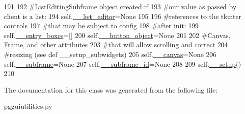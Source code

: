 \begin{DoxyCode}
191 
192         \textcolor{comment}{#ListEditingSubframe object created if}
193         \textcolor{comment}{#our value as passed by client is a list:}
194         self.\hyperlink{classnegui_1_1pgguiutilities_1_1KeyValFrame_a7c41f848553b931f4d4410746f536e80}{\_\_list\_editor}=\textcolor{keywordtype}{None}
195 
196         \textcolor{comment}{#references to the tkinter controls}
197         \textcolor{comment}{#that may be subject to config}
198         \textcolor{comment}{#after init:}
199         self.\hyperlink{classnegui_1_1pgguiutilities_1_1KeyValFrame_aca02061228a06555b1089c0f29e76c16}{\_\_entry\_boxes}=[]
200         self.\hyperlink{classnegui_1_1pgguiutilities_1_1KeyValFrame_a81a445bf0dde094f7a637862633f326d}{\_\_button\_object}=\textcolor{keywordtype}{None}
201 
202         \textcolor{comment}{#Canvas, Frame, and other attributes}
203         \textcolor{comment}{#that will allow scrolling and correct}
204         \textcolor{comment}{#resizing (see def \_\_setup\_subwidgets)}
205         self.\hyperlink{classnegui_1_1pgguiutilities_1_1KeyValFrame_a84a06231bb7ea897130918df961a8b7a}{\_\_canvas}=\textcolor{keywordtype}{None}
206         self.\hyperlink{classnegui_1_1pgguiutilities_1_1KeyValFrame_a235e50f36bb184384f5890419a5fbe6b}{\_\_subframe}=\textcolor{keywordtype}{None}
207         self.\hyperlink{classnegui_1_1pgguiutilities_1_1KeyValFrame_a142189024bf58f59618aa83128270459}{\_\_subframe\_id}=\textcolor{keywordtype}{None}
208         
209         self.\hyperlink{classnegui_1_1pgguiutilities_1_1KeyValFrame_a9d6430a9f908364c1f00e07b47dcbff5}{\_\_setup}()
210 
\end{DoxyCode}


The documentation for this class was generated from the following file\+:\begin{DoxyCompactItemize}
\item 
pgguiutilities.\+py\end{DoxyCompactItemize}

